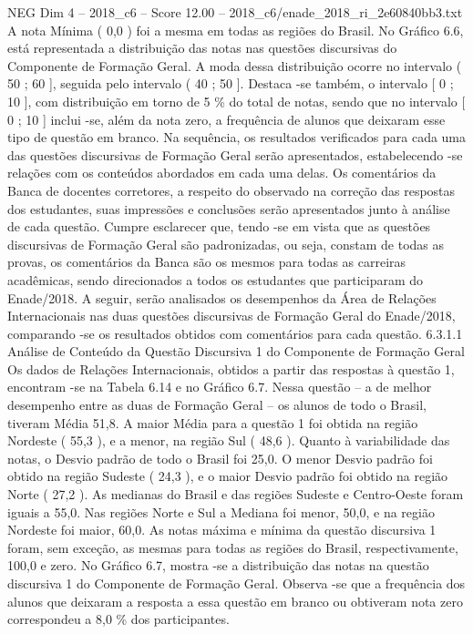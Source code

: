 \begin{textsample}{NEG Dim 4 – 2018\_c6 – Score 12.00 – 2018\_c6/enade\_2018\_ri\_2e60840bb3.txt}
A nota Mínima ( 0,0 ) foi a mesma em todas as regiões do Brasil.
No Gráfico 6.6, está representada a distribuição das notas nas questões discursivas do Componente de Formação Geral.
A moda dessa distribuição ocorre no intervalo ( 50 ; 60 ], seguida pelo intervalo ( 40 ; 50 ].
Destaca -se também, o intervalo [ 0 ; 10 ], com distribuição em torno de 5 \% do total de notas, sendo que no intervalo [ 0 ; 10 ] inclui -se, além da nota zero, a frequência de alunos que deixaram esse tipo de questão em branco.
Na sequência, os resultados verificados para cada uma das questões discursivas de Formação Geral serão apresentados, estabelecendo -se relações com os conteúdos abordados em cada uma delas.
Os comentários da Banca de docentes corretores, a respeito do observado na correção das respostas dos estudantes, suas impressões e conclusões serão apresentados junto à análise de cada questão.
Cumpre esclarecer que, tendo -se em vista que as questões discursivas de Formação Geral são padronizadas, ou seja, constam de todas as provas, os comentários da Banca são os mesmos para todas as carreiras acadêmicas, sendo direcionados a todos os estudantes que participaram do Enade/2018.
A seguir, serão analisados os desempenhos da Área de Relações Internacionais nas duas questões discursivas de Formação Geral do Enade/2018, comparando -se os resultados obtidos com comentários para cada questão. 6.3.1.1 Análise de Conteúdo da Questão Discursiva 1 do Componente de Formação Geral Os dados de Relações Internacionais, obtidos a partir das respostas à questão 1, encontram -se na Tabela 6.14 e no Gráfico 6.7.
Nessa questão – a de melhor desempenho entre as duas de Formação Geral – os alunos de todo o Brasil, tiveram Média 51,8.
A maior Média para a questão 1 foi obtida na região Nordeste ( 55,3 ), e a menor, na região Sul ( 48,6 ).
Quanto à variabilidade das notas, o Desvio padrão de todo o Brasil foi 25,0.
O menor Desvio padrão foi obtido na região Sudeste ( 24,3 ), e o maior Desvio padrão foi obtido na região Norte ( 27,2 ).
As medianas do Brasil e das regiões Sudeste e Centro-Oeste foram iguais a 55,0.
Nas regiões Norte e Sul a Mediana foi menor, 50,0, e na região Nordeste foi maior, 60,0.
As notas máxima e mínima da questão discursiva 1 foram, sem exceção, as mesmas para todas as regiões do Brasil, respectivamente, 100,0 e zero.
No Gráfico 6.7, mostra -se a distribuição das notas na questão discursiva 1 do Componente de Formação Geral.
Observa -se que a frequência dos alunos que deixaram a resposta a essa questão em branco ou obtiveram nota zero correspondeu a 8,0 \% dos participantes.

\end{textsample}
